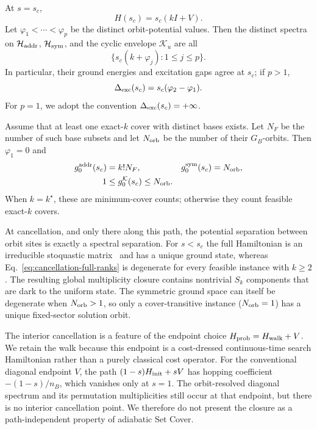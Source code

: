 \begin{theorem}
\label{thm:orbit-resolved-cancellation}
At $s=s_c$,
\begin{equation}
 H(s_c)=s_c(kI+V).
 \label{eq:cancellation-identity}
\end{equation}
Let $\varphi_1<\cdots<\varphi_p$ be the distinct orbit-potential values.
Then the distinct spectra on $\mathcal H_{\rm addr}$,
$\mathcal H_{\rm sym}$, and the cyclic envelope $\mathcal K_u$ are all
\begin{equation}
 \{s_c(k+\varphi_j):1\leq j\leq p\}.
 \label{eq:cancellation-levels}
\end{equation}
In particular, their ground energies and excitation gaps agree at $s_c$;
if $p>1$,
\begin{equation}
 \Delta_{\rm exc}(s_c)=s_c(\varphi_2-\varphi_1).
 \label{eq:cancellation-gap}
\end{equation}
For $p=1$, we adopt the convention $\Delta_{\rm exc}(s_c)=+\infty$.

Assume that at least one exact-$k$ cover with distinct bases exists.  Let
$N_F$ be the number of such base subsets and let $N_{\rm orb}$ be the
number of their $G_B$-orbits.  Then $\varphi_1=0$ and
\begin{align}
 g_0^{\rm addr}(s_c)&=k!N_F,&
 g_0^{\rm sym}(s_c)&=N_{\rm orb},
 \label{eq:cancellation-full-ranks}\\
 1&\leq g_0^{\mathcal K}(s_c)\leq N_{\rm orb}.
 \label{eq:cancellation-cyclic-rank}
\end{align}
When $k=k^\star$, these are minimum-cover counts; otherwise they count
feasible exact-$k$ covers.
\end{theorem}

At cancellation, and only there along this path, the potential separation
between orbit sites is exactly a spectral separation.  For $s<s_c$ the full
Hamiltonian is an irreducible stoquastic matrix~\cite{BravyiEtAl2008Stoquastic}
and has a unique ground
state, whereas Eq.~\eqref{eq:cancellation-full-ranks} is degenerate for every
feasible instance with $k\geq2$.  The resulting global multiplicity closure
contains nontrivial $S_k$ components that are dark to the uniform state.
The symmetric ground space can itself be degenerate when
$N_{\rm orb}>1$, so only a cover-transitive instance
($N_{\rm orb}=1$) has a unique fixed-sector solution orbit.

The interior cancellation is a feature of the endpoint choice
$H_{\rm prob}=H_{\rm walk}+V$.  We retain the walk because this endpoint is
a cost-dressed continuous-time search Hamiltonian rather than a purely
classical cost operator.  For the conventional diagonal endpoint $V$, the
path $(1-s)H_{\rm init}+sV$ has hopping coefficient $-(1-s)/n_B$, which
vanishes only at $s=1$.  The orbit-resolved diagonal spectrum and its
permutation multiplicities still occur at that endpoint, but there is no
interior cancellation point.  We therefore do not present the closure as a
path-independent property of adiabatic Set Cover.

